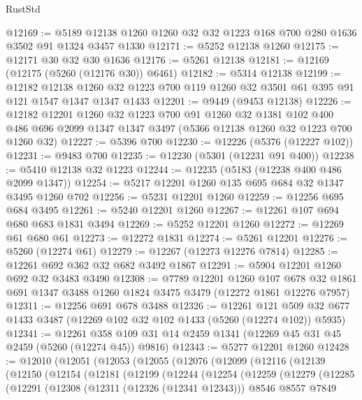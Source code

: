 \begin{lexlean}{RustStd}
\begin{coremodule}
@12169 := @5189 @12138 @1260 @1260 @32 @32 @1223 @168 @700 @280 @1636 @3502 @91 @1324 @3457 @1330
@12171 := @5252 @12138 @1260
@12175 := @12171 @30 @32 @30 @1636
@12176 := @5261 @12138
@12181 := @12169 (@12175 (@5260 (@12176 @30)) @6461)
@12182 := @5314 @12138
@12199 := @12182
    @12138
    @1260
    @32
    @1223
    @700
    @119
    @1260
    @32
    @3501
    @61
    @395
    @91
    @121
    @1547
    @1347
    @1347
    @1433
@12201 := @9449 (@9453 @12138)
@12226 := @12182
    @12201
    @1260
    @32
    @1223
    @700
    @91
    @1260
    @32
    @1381
    @102
    @400
    @486
    @696
    @2099
    @1347
    @1347
    @3497
    (@5366 @12138 @1260 @32 @1223 @700 @1260 @32)
@12227 := @5396 @700
@12230 := @12226 (@5376 (@12227 @102))
@12231 := @9483 @700
@12235 := @12230 (@5301 (@12231 @91 @400))
@12238 := @5410 @12138 @32 @1223
@12244 := @12235 (@5183 (@12238 @400 @486 @2099 @1347))
@12254 := @5217 @12201 @1260 @135 @695 @684 @32 @1347 @3495 @1260 @702
@12256 := @5231 @12201 @1260
@12259 := @12256 @695 @684 @3495
@12261 := @5240 @12201 @1260
@12267 := @12261 @107 @694 @680 @683 @1831 @3494
@12269 := @5252 @12201 @1260
@12272 := @12269 @61 @680 @61
@12273 := @12272 @1831
@12274 := @5261 @12201
@12276 := @5260 (@12274 @61)
@12279 := @12267 (@12273 @12276 @7814)
@12285 := @12261 @692 @362 @32 @682 @3492 @1867
@12291 := @5904 @12201 @1260 @692 @32 @3483 @3490
@12308 := @7789
    @12201
    @1260
    @107
    @678
    @32
    @1861
    @691
    @1347
    @3488
    @1260
    @1824
    @3475
    @3479
    (@12272 @1861 @12276 @7957)
@12311 := @12256 @691 @678 @3488
@12326 := @12261
    @121
    @509
    @32
    @677
    @1433
    @3487
    (@12269 @102 @32 @102 @1433 (@5260 (@12274 @102)) @5935)
@12341 := @12261 @358 @109 @31 @14 @2459 @1341 (@12269 @45 @31 @45 @2459 (@5260 (@12274 @45)) @9816)
@12343 := @5277 @12201 @1260
@12428 := @12010
    (@12051
      (@12053
        (@12055
          (@12076
            (@12099
              (@12116
                (@12139
                  (@12150
                    (@12154
                      (@12181
                        (@12199
                          (@12244
                            (@12254
                              (@12259
                                (@12279
                                  (@12285
                                    (@12291
                                      (@12308
                                        (@12311 (@12326 (@12341 @12343)))
                                        @8546
                                        @8557
                                        @7849

\end{coremodule}
\end{lexlean}
